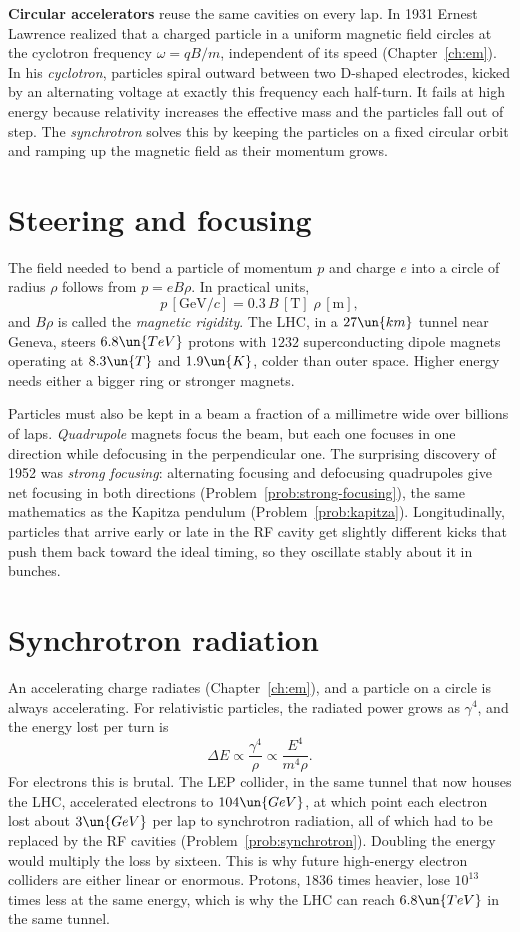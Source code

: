 \textbf{Circular accelerators} reuse the same cavities on every lap. In 1931 Ernest Lawrence realized that a charged particle in a uniform magnetic field circles at the cyclotron frequency $\omega = qB/m$, independent of its speed (Chapter~\ref{ch:em}). In his \emph{cyclotron}, particles spiral outward between two D-shaped electrodes, kicked by an alternating voltage at exactly this frequency each half-turn. It fails at high energy because relativity increases the effective mass and the particles fall out of step. The \emph{synchrotron} solves this by keeping the particles on a fixed circular orbit and ramping up the magnetic field as their momentum grows.

\section{Steering and focusing}

The field needed to bend a particle of momentum $p$ and charge $e$ into a circle of radius $\rho$ follows from $p = eB\rho$. In practical units,
\[
  p\,[\mathrm{GeV}/c] = 0.3\,B\,[\mathrm{T}]\;\rho\,[\mathrm{m}],
\]
and $B\rho$ is called the \emph{magnetic rigidity}. The LHC, in a $27\un{km}$ tunnel near Geneva, steers $6.8\un{TeV}$ protons with $1232$ superconducting dipole magnets operating at $8.3\un{T}$ and $1.9\un{K}$, colder than outer space. Higher energy needs either a bigger ring or stronger magnets.

Particles must also be kept in a beam a fraction of a millimetre wide over billions of laps. \emph{Quadrupole} magnets focus the beam, but each one focuses in one direction while defocusing in the perpendicular one. The surprising discovery of 1952 was \emph{strong focusing}: alternating focusing and defocusing quadrupoles give net focusing in both directions (Problem~\ref{prob:strong-focusing}), the same mathematics as the Kapitza pendulum (Problem~\ref{prob:kapitza}). Longitudinally, particles that arrive early or late in the RF cavity get slightly different kicks that push them back toward the ideal timing, so they oscillate stably about it in bunches.

\section{Synchrotron radiation}

An accelerating charge radiates (Chapter~\ref{ch:em}), and a particle on a circle is always accelerating. For relativistic particles, the radiated power grows as $\gamma^4$, and the energy lost per turn is
\[
  \Delta E\propto\frac{\gamma^4}{\rho}\propto\frac{E^4}{m^4\rho}.
\]
For electrons this is brutal. The LEP collider, in the same tunnel that now houses the LHC, accelerated electrons to $104\un{GeV}$, at which point each electron lost about $3\un{GeV}$ per lap to synchrotron radiation, all of which had to be replaced by the RF cavities (Problem~\ref{prob:synchrotron}). Doubling the energy would multiply the loss by sixteen. This is why future high-energy electron colliders are either linear or enormous. Protons, $1836$ times heavier, lose $10^{13}$ times less at the same energy, which is why the LHC can reach $6.8\un{TeV}$ in the same tunnel.

